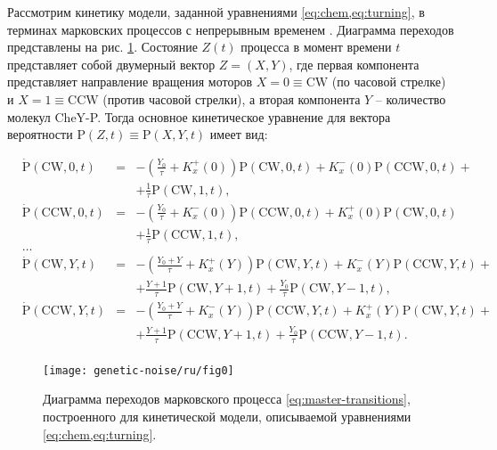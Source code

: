Рассмотрим кинетику модели, заданной уравнениями \cref{eq:chem,eq:turning}, в терминах марковских процессов с непрерывным временем \cite{tikhonov_markov_process_1977}. Диаграмма переходов представлены на рис. \cref{fig:transitions}. Состояние $Z(t)$ процесса в момент времени $t$ представляет собой двумерный вектор $Z = (X, Y)$, где первая компонента представляет направление вращения моторов $X = 0 \equiv \mathrm{CW}$ (по часовой стрелке) и $X = 1 \equiv \mathrm{CCW}$ (против часовой стрелки), а вторая компонента $Y$ -- количество молекул CheY-P. Тогда основное кинетическое уравнение для вектора вероятности $\mathrm{P}(Z, t) \equiv \mathrm{P}(X, Y, t)$ имеет вид:

\begin{equation}
    \begin{aligned}
        &\dot{\mathrm{P}}(\mathrm{CW},0,t)&=&-\left (\frac{Y_0}{\tau} + K_x^+(0) \right ) \mathrm{P}(\mathrm{CW},0,t) + K_x^-(0) \mathrm{P}(\mathrm{CCW},0,t)+&&\\
        &&&+\frac{1}{\tau}\mathrm{P}(\mathrm{CW},1,t),&&\\
        &\dot{\mathrm{P}}(\mathrm{CCW},0,t)&=&-\left (\frac{Y_0}{\tau} + K_x^-(0) \right ) \mathrm{P}(\mathrm{CCW},0,t) + K_x^+(0) \mathrm{P}(\mathrm{CW},0,t)&&\\
        &&&+\frac{1}{\tau}\mathrm{P}(\mathrm{CCW},1,t),&&\\
        &\dots&&\\
        &\dot{\mathrm{P}}(\mathrm{CW},Y,t)&=&-\left (\frac{Y_0+Y}{\tau} + K_x^+(Y) \right ) \mathrm{P}(\mathrm{CW},Y,t) + K_x^-(Y) \mathrm{P}(\mathrm{CCW},Y,t)+&&\\
        &&&+\frac{Y+1}{\tau}\mathrm{P}(\mathrm{CW},Y+1,t)+\frac{Y_0}{\tau}\mathrm{P}(\mathrm{CW},Y-1,t),&&\\
        &\dot{\mathrm{P}}(\mathrm{CCW},Y,t)&=&-\left (\frac{Y_0+Y}{\tau} + K_x^-(Y) \right ) \mathrm{P}(\mathrm{CCW},Y,t) + K_x^+(Y) \mathrm{P}(\mathrm{CW},Y,t)+&&\\
        &&&+\frac{Y+1}{\tau}\mathrm{P}(\mathrm{CCW},Y+1,t)+\frac{Y_0}{\tau}\mathrm{P}(\mathrm{CCW},Y-1,t).&&\\
    \end{aligned}
    \label{eq:master-transitions}
\end{equation}


\begin{figure}[ht]
    \centering
    \texttt{[image: genetic-noise/ru/fig0]}
    \caption{
        Диаграмма переходов марковского процесса \cref{eq:master-transitions}, построенного для кинетической модели, описываемой уравнениями \cref{eq:chem,eq:turning}.
    }
    \label{fig:transitions}
\end{figure}

